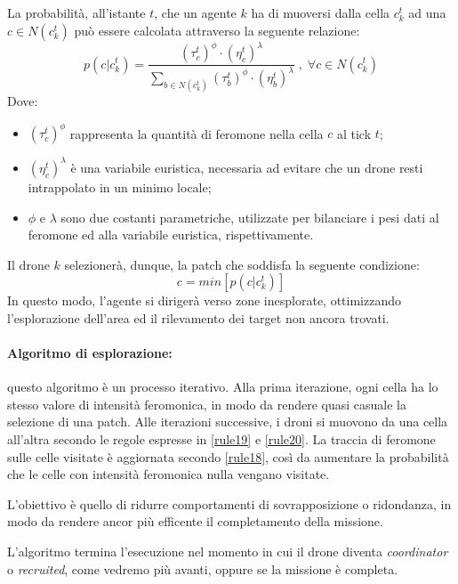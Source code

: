 La probabilità, all'istante $t$, che un agente $k$ ha di muoversi dalla cella $c_{k}^{t}$ ad una $c \in N(c_{k}^{t})$ può essere calcolata attraverso la seguente relazione:
\begin{equation}\label{rule19}
    p(c|c_{k}^{t}) = \frac{(\tau_{c}^{t})^{\phi} \cdot (\eta_{c}^{t})^{\lambda}}{\sum_{b \in N(c_{k}^{t})}(\tau_{b}^{t})^{\phi} \cdot (\eta_{b}^{t})^{\lambda}} \; , \; \forall c \in N(c_{k}^{t})
\end{equation}
Dove:
\begin{itemize}
    \item $(\tau_{c}^{t})^{\phi}$ rappresenta la quantità di feromone nella cella $c$ al tick $t$;
    \item $(\eta_{c}^{t})^{\lambda}$ è una variabile euristica, necessaria ad evitare che un drone resti intrappolato in un minimo locale;
    \item $\phi$ e $\lambda$ sono due costanti parametriche, utilizzate per bilanciare i pesi dati al feromone ed alla variabile euristica, rispettivamente.
\end{itemize}
Il drone $k$ selezionerà, dunque, la patch che soddisfa la seguente condizione:
\begin{equation}
    c = min[p(c|c_{k}^{t})]\label{rule20}
\end{equation}
In questo modo, l'agente si dirigerà verso zone inesplorate, ottimizzando l'esplorazione dell'area ed il rilevamento dei target non ancora trovati.

\paragraph{Algoritmo di esplorazione:} questo algoritmo è un processo iterativo. 
Alla prima iterazione, ogni cella ha lo stesso valore di intensità feromonica, in modo da rendere quasi casuale la selezione di una patch.
Alle iterazioni successive, i droni si muovono da una cella all'altra secondo le regole espresse in \ref{rule19} e \ref{rule20}.
La traccia di feromone sulle celle visitate è aggiornata secondo \ref{rule18}, così da aumentare la probabilità che le celle con intensità feromonica nulla vengano visitate.

L'obiettivo è quello di ridurre comportamenti di sovrapposizione o ridondanza, in modo da rendere ancor più efficente il completamento della missione.

L'algoritmo termina l'esecuzione nel momento in cui il drone diventa \textit{coordinator} o \textit{recruited}, come vedremo più avanti, oppure se la missione è completa.

